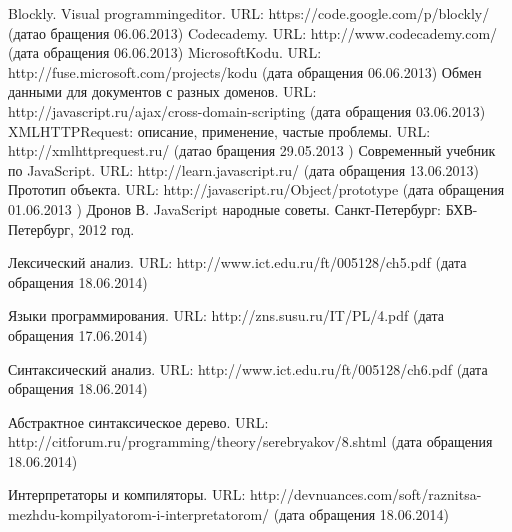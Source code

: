 
\begin{thebibliography}{99}
	Blockly. Visual programmingeditor. URL: https://code.google.com/p/blockly/ (датао бращения 06.06.2013)
	Codecademy. URL: http://www.codecademy.com/ (дата обращения 06.06.2013)
	MicrosoftKodu. URL: http://fuse.microsoft.com/projects/kodu (дата обращения 06.06.2013)
	Обмен данными для документов с разных доменов. URL: http://javascript.ru/ajax/cross-domain-scripting  (дата обращения 03.06.2013)
	XMLHTTPRequest: описание, применение, частые проблемы. URL: http://xmlhttprequest.ru/ (датао бращения 29.05.2013 )
	Современный учебник по JavaScript. URL: http://learn.javascript.ru/ (дата обращения  13.06.2013)
	Прототип объекта. URL: http://javascript.ru/Object/prototype (дата обращения 01.06.2013 )
	Дронов В. JavaScript народные советы. Санкт-Петербург: БХВ-Петербург, 2012 год.

	Лексический анализ. URL: http://www.ict.edu.ru/ft/005128/ch5.pdf (дата обращения 18.06.2014)

	Языки программирования. URL: http://zns.susu.ru/IT/PL/4.pdf (дата обращения 17.06.2014)

	Синтаксический анализ. URL: http://www.ict.edu.ru/ft/005128/ch6.pdf (дата обращения 18.06.2014)

	Абстрактное синтаксическое дерево. URL: http://citforum.ru/programming/theory/serebryakov/8.shtml (дата обращения 18.06.2014)

	Интерпретаторы и компиляторы. URL: http://devnuances.com/soft/raznitsa-mezhdu-kompilyatorom-i-interpretatorom/ (дата обращения 18.06.2014)



\end{thebibliography}
